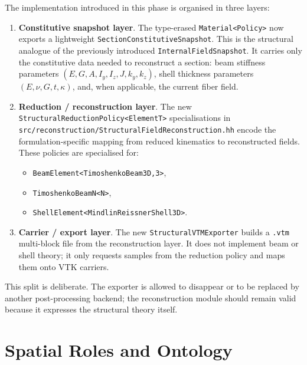 The implementation introduced in this phase is organised in three layers:
\begin{enumerate}
  \item \textbf{Constitutive snapshot layer}.  The type-erased
        \texttt{Material<Policy>} now exports a lightweight
        \texttt{SectionConstitutiveSnapshot}.  This is the structural analogue
        of the previously introduced \texttt{InternalFieldSnapshot}.  It
        carries only the constitutive data needed to reconstruct a section:
        beam stiffness parameters $(E,G,A,I_y,I_z,J,k_y,k_z)$, shell thickness
        parameters $(E,\nu,G,t,\kappa)$, and, when applicable, the current
        fiber field.
  \item \textbf{Reduction / reconstruction layer}.  The new
        \texttt{StructuralReductionPolicy<ElementT>} specialisations in
        \texttt{src/reconstruction/StructuralFieldReconstruction.hh} encode the
        formulation-specific mapping from reduced kinematics to reconstructed
        fields.  These policies are specialised for:
        \begin{itemize}
          \item \texttt{BeamElement<TimoshenkoBeam3D,3>},
          \item \texttt{TimoshenkoBeamN<N>},
          \item \texttt{ShellElement<MindlinReissnerShell3D>}.
        \end{itemize}
  \item \textbf{Carrier / export layer}.  The new
        \texttt{StructuralVTMExporter} builds a \texttt{.vtm} multi-block file
        from the reconstruction layer.  It does not implement beam or shell
        theory; it only requests samples from the reduction policy and maps
        them onto VTK carriers.
\end{enumerate}

This split is deliberate.  The exporter is allowed to disappear or to be
replaced by another post-processing backend; the reconstruction module should
remain valid because it expresses the structural theory itself.

\section{Spatial Roles and Ontology}

